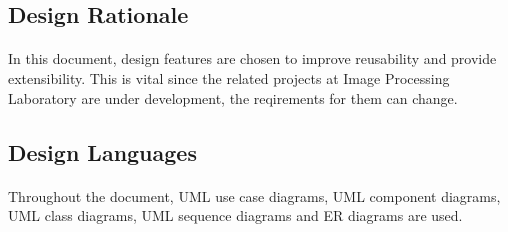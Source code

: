 \subsection{Design Rationale}
\paragraph{}
\normalsize
	In this document, design features are chosen to improve reusability and provide extensibility. This is vital since the related projects at Image Processing Laboratory are under development, the reqirements for them can change.
\skipsubsection


\subsection{Design Languages}
\paragraph{}
\normalsize
	Throughout the document, UML use case diagrams, UML component diagrams, UML class diagrams, UML sequence diagrams and ER diagrams are used.
\skipsubsection
